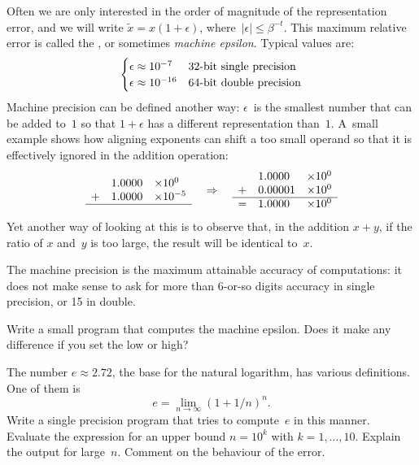 Often we are only interested in the order of magnitude of the
representation error,
and we will write $\tilde x=x(1+\epsilon)$, where~$|\epsilon|\leq\beta^{-t}$.
This maximum relative error is called the , or sometimes \emph{machine epsilon}. Typical values are:
\[
\begin{cases}
  \epsilon\approx10^{-7}&\hbox{32-bit single precision}\\
  \epsilon\approx10^{-16}&\hbox{64-bit double precision}
\end{cases}
\]
Machine precision can be defined another way: $\epsilon$~is the
smallest number that can be added to~$1$ so that $1+\epsilon$ has a
different representation than~$1$. A~small example shows how aligning
exponents can shift a too small operand so that it is effectively ignored in
the addition operation:
\[
\begin{array}{cll}
   &1.0000&\times 10^0\\
  +&1.0000&\times 10^{-5}\\ \hline
\end{array}
\quad\Rightarrow\quad
\begin{array}{cll}
   &1.0000&\times 10^0\\
  +&0.00001&\times 10^0\\ \hline
  =&1.0000&\times 10^0
\end{array}
\]
Yet another way of looking at this
is to observe that, in the addition $x+y$, if the ratio of $x$ and~$y$
is too large, the result will be identical to~$x$.

The machine precision is the maximum attainable accuracy of
computations: it does not make sense to ask for more than 6-or-so
digits accuracy in single precision, or 15 in double.

\begin{exercise}
  \label{ex:epsilon}%
  Write a small program that computes the machine epsilon. Does it
  make any difference if you set the
   low or high? 
\end{exercise}

\begin{exercise}
  The number $e\approx 2.72$, the base for the natural logarithm, has
  various definitions. One of them is 
  \[ e=\lim_{n\rightarrow\infty} (1+1/n)^n. \]
  Write a single precision program that tries to compute~$e$ in this
  manner. Evaluate the expression for an upper bound $n=10^k$ with
  $k=1,\ldots,10$. Explain the output for large~$n$. Comment on the
  behaviour of the error.
\end{exercise}

